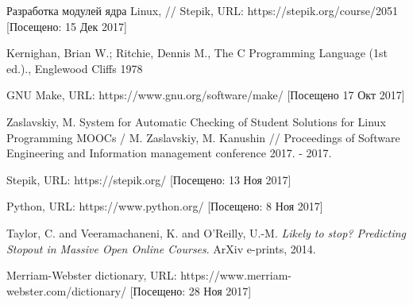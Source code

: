 
\begin{thebibliography}{1}  
Разработка модулей ядра Linux, // Stepik, URL:
https://stepik.org/course/2051
[Посещено: 15 Дек 2017]

Kernighan, Brian W.; Ritchie, Dennis M.,
The C Programming Language (1st ed.).,
Englewood Cliffs 1978

GNU Make,
URL: https://www.gnu.org/software/make/
[Посещено 17 Окт 2017]

Zaslavskiy, M. System for Automatic Checking of Student Solutions for Linux Programming MOOCs / 
M. Zaslavskiy, M. Kanushin //
Proceedings of Software Engineering and Information management conference 2017. - 2017.

Stepik,
URL: https://stepik.org/
[Посещено: 13 Ноя 2017]

Python,
URL: https://www.python.org/
[Посещено: 8 Ноя 2017]

{Taylor}, C. and {Veeramachaneni}, K. and {O'Reilly}, U.-M.
\textit{Likely to stop? Predicting Stopout in Massive Open Online Courses}.
ArXiv e-prints, 2014.

Merriam-Webster dictionary,
URL: https://www.merriam-webster.com/dictionary/
[Посещено: 28 Ноя 2017]	

\end{thebibliography}